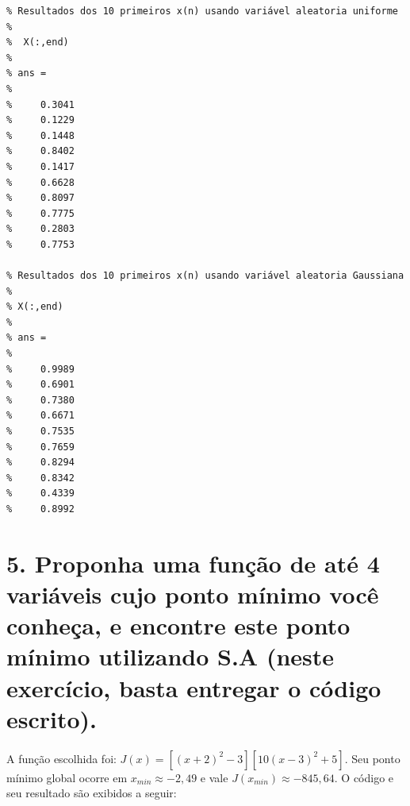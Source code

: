 \documentclass{report}
\begin{document}
\begin{verbatim}
% Resultados dos 10 primeiros x(n) usando variável aleatoria uniforme
% 
%  X(:,end)
% 
% ans =
% 
%     0.3041
%     0.1229
%     0.1448
%     0.8402
%     0.1417
%     0.6628
%     0.8097
%     0.7775
%     0.2803
%     0.7753

% Resultados dos 10 primeiros x(n) usando variável aleatoria Gaussiana
% 
% X(:,end)
% 
% ans =
% 
%     0.9989
%     0.6901
%     0.7380
%     0.6671
%     0.7535
%     0.7659
%     0.8294
%     0.8342
%     0.4339
%     0.8992
\end{verbatim}

\section*{5. Proponha uma função de até 4 variáveis cujo ponto mínimo você conheça, e encontre este ponto mínimo utilizando S.A (neste exercício, basta entregar o código escrito).}

\paragraph{} A função escolhida foi: $J(x) = [(x+2)^2 - 3][10(x-3)^2 + 5]$. Seu ponto mínimo global ocorre em $x_{min} \approx -2,49$ e vale $J(x_{min}) \approx -845,64$. O código e seu resultado são exibidos a seguir:
\end{document}
